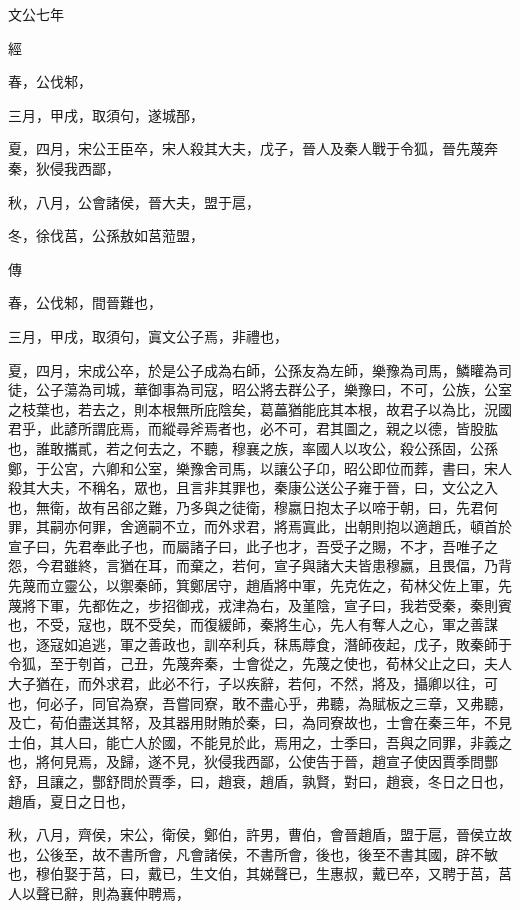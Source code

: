 \documentclass[fontset = none]{ctexart}
\begin{document}
文公七年


經



春，公伐邾，

三月，甲戌，取須句，遂城郚，

夏，四月，宋公王臣卒，宋人殺其大夫，戊子，晉人及秦人戰于令狐，晉先蔑奔秦，狄侵我西鄙，

秋，八月，公會諸侯，晉大夫，盟于扈，

冬，徐伐莒，公孫敖如莒蒞盟，

傳



春，公伐邾，間晉難也，

三月，甲戌，取須句，寘文公子焉，非禮也，

夏，四月，宋成公卒，於是公子成為右師，公孫友為左師，樂豫為司馬，鱗矔為司徒，公子蕩為司城，華御事為司寇，昭公將去群公子，樂豫曰，不可，公族，公室之枝葉也，若去之，則本根無所庇陰矣，葛藟猶能庇其本根，故君子以為比，況國君乎，此諺所謂庇焉，而縱尋斧焉者也，必不可，君其圖之，親之以德，皆股肱也，誰敢攜貳，若之何去之，不聽，穆襄之族，率國人以攻公，殺公孫固，公孫鄭，于公宮，六卿和公室，樂豫舍司馬，以讓公子卬，昭公即位而葬，書曰，宋人殺其大夫，不稱名，眾也，且言非其罪也，秦康公送公子雍于晉，曰，文公之入也，無衛，故有呂郤之難，乃多與之徒衛，穆嬴日抱太子以啼于朝，曰，先君何罪，其嗣亦何罪，舍適嗣不立，而外求君，將焉寘此，出朝則抱以適趙氏，頓首於宣子曰，先君奉此子也，而屬諸子曰，此子也才，吾受子之賜，不才，吾唯子之怨，今君雖終，言猶在耳，而棄之，若何，宣子與諸大夫皆患穆嬴，且畏偪，乃背先蔑而立靈公，以禦秦師，箕鄭居守，趙盾將中軍，先克佐之，荀林父佐上軍，先蔑將下軍，先都佐之，步招御戎，戎津為右，及堇陰，宣子曰，我若受秦，秦則賓也，不受，寇也，既不受矣，而復緩師，秦將生心，先人有奪人之心，軍之善謀也，逐寇如追逃，軍之善政也，訓卒利兵，秣馬蓐食，潛師夜起，戊子，敗秦師于令狐，至于刳首，己丑，先蔑奔秦，士會從之，先蔑之使也，荀林父止之曰，夫人大子猶在，而外求君，此必不行，子以疾辭，若何，不然，將及，攝卿以往，可也，何必子，同官為寮，吾嘗同寮，敢不盡心乎，弗聽，為賦板之三章，又弗聽，及亡，荀伯盡送其帑，及其器用財賄於秦，曰，為同寮故也，士會在秦三年，不見士伯，其人曰，能亡人於國，不能見於此，焉用之，士季曰，吾與之同罪，非義之也，將何見焉，及歸，遂不見，狄侵我西鄙，公使告于晉，趙宣子使因賈季問酆舒，且讓之，酆舒問於賈季，曰，趙衰，趙盾，孰賢，對曰，趙衰，冬日之日也，趙盾，夏日之日也，

秋，八月，齊侯，宋公，衛侯，鄭伯，許男，曹伯，會晉趙盾，盟于扈，晉侯立故也，公後至，故不書所會，凡會諸侯，不書所會，後也，後至不書其國，辟不敏也，穆伯娶于莒，曰，戴已，生文伯，其娣聲已，生惠叔，戴已卒，又聘于莒，莒人以聲已辭，則為襄仲聘焉，
\end{document}

